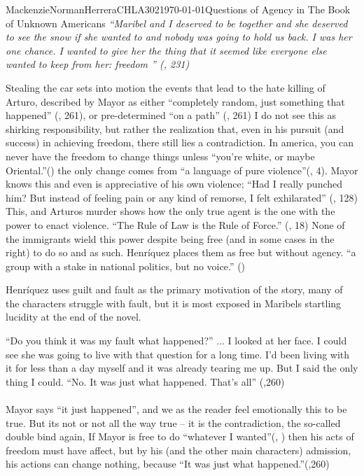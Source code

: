 \documentclass{article}
\begin{document}
\begin{mla}{Mackenzie}{Norman}{Herrera}{CHLA302}{\today}{Questions of Agency in The Book of Unknown Americans}
\textit{``Maribel and I deserved to be together and she deserved to see the snow if she wanted to and nobody was going to hold us back. I was her one chance. I wanted to give her the thing that it seemed like everyone else wanted to keep from her: freedom '' (\cite{Henriquez2014-sh}, 231)}

Stealing the car sets into motion the events that lead to the hate killing of Arturo, described by Mayor as either ``completely random, just something that happened'' (\cite{Henriquez2014-sh}, 261), or pre-determined ``on a path'' (\cite{Henriquez2014-sh}, 261) I do not see this as shirking responsibility, but rather the realization that, even in his pursuit (and success) in achieving freedom, there still lies a contradiction. In america, you can never have the freedom to change things unless ``you're white, or maybe Oriental.''(\cite{Henriquez2014-sh}) the only change comes from ``a language of pure violence''(\cite{wretched}, 4). Mayor knows this and even is appreciative of his own violence; ``Had I really punched him? But instead of feeling pain or any kind of remorse, I felt exhilarated'' (\cite{Henriquez2014-sh}, 128) This, and Arturos murder shows how the only true agent is the one with the power to enact violence. ``The Rule of Law is the Rule of Force.'' (\cite{loves-bdy}, 18) None of the immigrants wield this power despite being free (and in some cases in the right) to do so and as such. Henríquez places them as free but without agency. ``a group with a stake in national politics, but no voice.'' (\cite{Lutes_Travis_2021})

Henríquez uses guilt and fault as the primary motivation of the story, many of the characters struggle with fault, but it is most exposed in Maribels startling lucidity at the end of the novel.

\noindent\linebreak
``Do you think it was my fault what happened?'' 
\noindent\linebreak
...
\noindent\linebreak
I looked at her face. I could see she was going to live with that question for a long time. I'd been living with it for less than a day myself and it was already tearing me up. But I said the only thing I could. ``No. It was just what happened. That's all'' (\cite{Henriquez2014-sh},260)
\paragraph{}
Mayor says ``it just happened'', and we as the reader feel emotionally this to be true. But its not or not all the way true -- it is the contradiction, the so-called double bind again, If Mayor is free to do ``whatever I wanted''(\cite{Henriquez2014-sh}, ) then his acts of freedom must have affect, but by his (and the other main characters) admission, his actions can change nothing, because ``It was just what happened.''(\cite{Henriquez2014-sh},260)


\end{mla}
\end{document}
